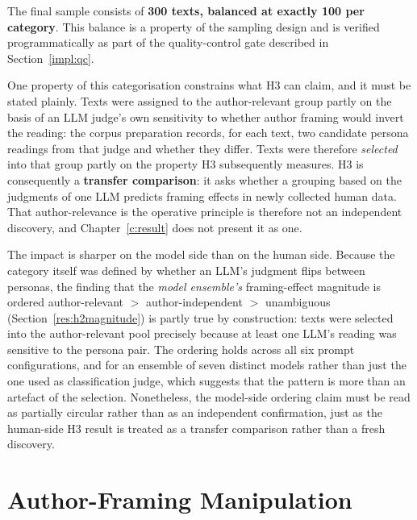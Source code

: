 \noindent
The final sample consists of \textbf{300 texts, balanced at exactly 100 per category}. This
balance is a property of the sampling design and is verified programmatically as part of the
quality-control gate described in Section~\ref{impl:qc}.

One property of this categorisation constrains what H3 can claim, and it must be stated
plainly. Texts were assigned to the author-relevant group partly on the basis of
an LLM judge's own sensitivity to whether author framing would invert the reading: the corpus
preparation records, for each text, two candidate persona readings from that judge and whether
they differ. Texts were therefore \emph{selected} into that group partly on the property H3
subsequently measures. H3 is consequently a \textbf{transfer comparison}: it asks whether a
grouping based on the judgments of one LLM predicts framing effects in newly collected human
data. That author-relevance is the operative principle is therefore not an independent
discovery, and Chapter~\ref{c:result} does not present it as one.

The impact is sharper on the model side than on the human side. Because the category itself was
defined by whether an LLM's judgment flips between personas, the finding that the \emph{model
ensemble's} framing-effect magnitude is ordered author-relevant $>$ author-independent $>$
unambiguous (Section~\ref{res:h2magnitude}) is partly true by construction: texts were selected into the
author-relevant pool precisely because at least one LLM's reading was sensitive to the persona
pair. The ordering holds across all six prompt configurations, and for an ensemble of seven
distinct models rather than just the one used as classification judge, which suggests that the
pattern is more than an artefact of the selection. Nonetheless, the model-side ordering claim must
be read as partially circular rather than as an independent confirmation, just as the
human-side H3 result is treated as a transfer comparison rather than a fresh discovery.

\section{Author-Framing Manipulation}
\label{meth:framing}

